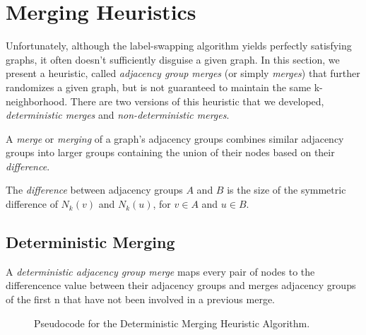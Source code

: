 \section{Merging Heuristics}
\indent Unfortunately, although the label-swapping algorithm yields perfectly satisfying graphs, it often doesn't sufficiently disguise a given graph.  In this section, we present a heuristic, called \emph{adjacency group merges} (or simply \emph{merges}) that further randomizes a given graph, but is not guaranteed to maintain the same k-neighborhood. There are two versions of this heuristic that we developed, \emph{deterministic merges} and \emph{non-deterministic merges}.

\begin{definition}
\noindent A \emph{merge} or \emph{merging} of a graph's adjacency groups combines similar adjacency groups into larger groups containing the union of their nodes based on their \emph{difference}.
\end{definition}

\begin{definition}
The \emph{difference} between adjacency groups $A$ and $B$ is the size of the symmetric difference of $N_k(v)$ and $N_k(u)$, for $v \in A$ and $u \in B$. 
\end{definition}

\subsection{Deterministic Merging}

\begin{definition}
A \emph{deterministic adjacency group merge} maps every pair of nodes to  the differencence value between their adjacency groups and merges adjacency groups of the first n that have not been involved in a previous merge.
\end{definition}

\begin{figure}[htb]
	\begin{algorithmic}
		\renewcommand{\algorithmicrequire}{\textbf{Input:}}
		\renewcommand{\algorithmicensure}{\textbf{Output:}}
			\EndFor
		\EndFor
		\EndFor
			\EndIf
		\EndIf
	\end{algorithmic}
	\caption{Pseudocode for the Deterministic Merging Heuristic Algorithm.}
	\label{fig:deterministic-merging}
\end{figure}

